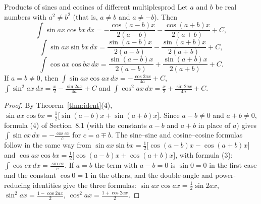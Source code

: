 \documentclass[11pt]{article}
\begin{document}
\begin{thm}{Products of sines and cosines of different multiples}{prod}
Let $a$ and $b$ be real numbers with $a^2\ne b^2$ (that is, $a\ne b$ and $a\ne-b$). Then
\[\int\sin ax\cos bx\,dx=-\frac{\cos(a-b)x}{2(a-b)}-\frac{\cos(a+b)x}{2(a+b)}+C,\]
\[\int\sin ax\sin bx\,dx=\frac{\sin(a-b)x}{2(a-b)}-\frac{\sin(a+b)x}{2(a+b)}+C,\]
\[\int\cos ax\cos bx\,dx=\frac{\sin(a-b)x}{2(a-b)}+\frac{\sin(a+b)x}{2(a+b)}+C .\]
If $a=b\ne0$, then $\int\sin ax\cos ax\,dx=-\frac{\cos2ax}{4a}+C$, $\int\sin^2ax\,dx=\frac x2-\frac{\sin2ax}{4a}+C$ and $\int\cos^2ax\,dx=\frac x2+\frac{\sin2ax}{4a}+C$.
\end{thm}
\begin{proof}
By Theorem~\ref{thm:ident}(4), $\sin ax\cos bx=\frac12\big[\sin(a-b)x+\sin(a+b)x\big]$. Since $a-b\ne0$ and $a+b\ne0$, formula (4) of Section~8.1 (with the constants $a-b$ and $a+b$ in place of $a$) gives $\int\sin cx\,dx=-\frac{\cos cx}c$ for $c=a\mp b$. The sine--sine and cosine--cosine formulas follow in the same way from $\sin ax\sin bx=\frac12\big[\cos(a-b)x-\cos(a+b)x\big]$ and $\cos ax\cos bx=\frac12\big[\cos(a-b)x+\cos(a+b)x\big]$, with formula (3): $\int\cos cx\,dx=\frac{\sin cx}c$. If $a=b$ the term with $a-b=0$ is $\sin0=0$ in the first case and the constant $\cos0=1$ in the others, and the double-angle and power-reducing identities give the three formulas: $\sin ax\cos ax=\frac12\sin2ax$, $\sin^2ax=\frac{1-\cos2ax}2$, $\cos^2ax=\frac{1+\cos2ax}2$.
\end{proof}
\end{document}

